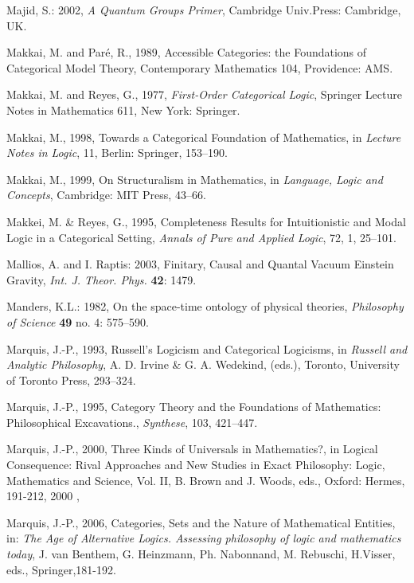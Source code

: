 \documentclass[12pt]{article}
\theoremstyle{plain}
\theoremstyle{definition}
\numberwithin{equation}{section}
\begin{document}
\begin{thebibliography}{99}
Majid, S.: 2002, \emph{A Quantum Groups Primer}, Cambridge Univ.Press: Cambridge, UK.

Makkai, M. and Par\'e, R., 1989, Accessible Categories: the Foundations of Categorical Model Theory, Contemporary Mathematics 104, Providence: AMS. 

Makkai, M. and Reyes, G., 1977, \emph{First-Order Categorical Logic}, Springer Lecture Notes in Mathematics 611, New York: Springer. 

Makkai, M., 1998, Towards a Categorical Foundation of Mathematics, in \emph{Lecture Notes in Logic}, 11, Berlin: Springer, 153--190. 

Makkai, M., 1999, On Structuralism in Mathematics, in \emph{Language, Logic and Concepts}, 
Cambridge: MIT Press, 43--66. 

Makkei, M. \& Reyes, G., 1995, Completeness Results for Intuitionistic and Modal Logic in a Categorical Setting, 
\emph{Annals of Pure and Applied Logic}, 72, 1, 25--101. 

Mallios, A. and I. Raptis: 2003, Finitary, Causal and Quantal Vacuum Einstein Gravity, \emph{Int. J. Theor. Phys.} \textbf{42}:
1479.

Manders, K.L.: 1982, On the space-time ontology of physical theories, \emph{Philosophy of Science} \textbf{49} no. 4: 575--590.

Marquis, J.-P., 1993, Russell's Logicism and Categorical Logicisms, in \emph{Russell and Analytic Philosophy}, A. D. Irvine \& G. A. Wedekind, (eds.), Toronto, University of Toronto Press, 293--324.

Marquis, J.-P., 1995, Category Theory and the Foundations of Mathematics: Philosophical Excavations., \emph{Synthese}, 103, 421--447. 

Marquis, J.-P., 2000, Three Kinds of Universals in Mathematics?, in {Logical Consequence: Rival Approaches and New Studies in Exact Philosophy: Logic, Mathematics and Science}, Vol. II, B. Brown and J. Woods, eds., Oxford: Hermes, 191-212, 2000 ,

Marquis, J.-P., 2006, Categories, Sets and the Nature of Mathematical Entities, in: \emph{The Age of Alternative Logics. Assessing philosophy of logic and mathematics today}, J. van Benthem, G. Heinzmann, Ph. Nabonnand, M. Rebuschi, H.Visser, eds., Springer,181-192. 


\end{thebibliography}
\end{document}
